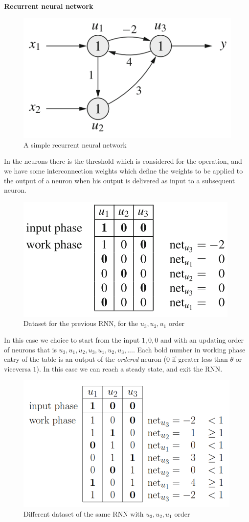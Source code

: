 \documentclass{article}
\begin{document}
\noindent\textbf{Recurrent neural network}
\begin{figure}[H]
    \centering
    \includegraphics[scale=0.5]{images/RNN.png}
    \caption{A simple recurrent neural network}
\end{figure}
In the neurons there is the threshold which is considered for the operation,
and we have some interconnection weights which define the weights to be applied to the output
of a neuron when his output is delivered as input to a subsequent neuron.
\begin{figure}[H]
    \centering
    \includegraphics[scale=0.6]{images/RNN_simpl_ex1.png}
    \caption{Dataset for the previous RNN, for the $u_3,u_2,u_1$ order}
\end{figure}
In this case we choice to start from the input $1,0,0$ and with an updating order of
neurons that is $u_3,u_1,u_2,u_3,u_1,u_2,u_3,...$. Each bold number in working phase
entry of the table is an output of the \textit{ordered} neuron ($0$ if greater less than $\theta$
or viceversa $1$). In this case we can reach a steady state, and exit the RNN.
\begin{figure}[H]
    \centering
    \includegraphics[scale=0.6]{images/RNN_simpl_ex2.png}
    \caption{Different dataset of the same RNN with $u_3,u_2,u_1$ order}
\end{figure}
\end{document}
